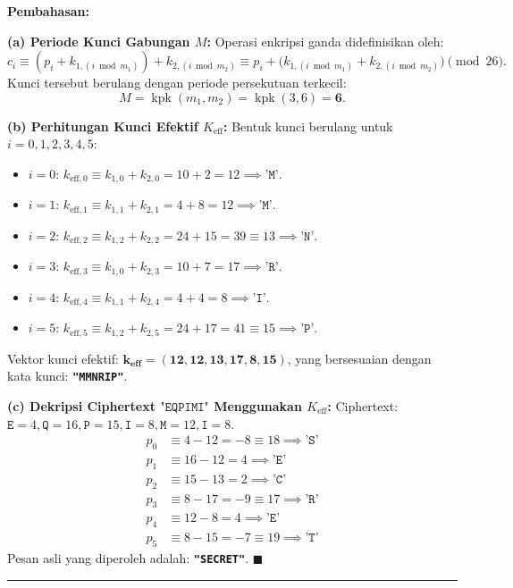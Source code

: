 \documentclass[11pt,a4paper]{article}
\newenvironment{solusi}{\noindent\textbf{\textsf{Pembahasan:}}\par\vspace{0.2em}}{\hfill$\blacksquare$\vspace{1em}\par\hrule\vspace{1em}}
\begin{document}
\begin{solusi}
\textbf{(a) Periode Kunci Gabungan $M$:}
Operasi enkripsi ganda didefinisikan oleh:
\[
c_i \equiv (p_i + k_{1, (i \bmod m_1)}) + k_{2, (i \bmod m_2)} \equiv p_i + \big(k_{1, (i \bmod m_1)} + k_{2, (i \bmod m_2)}\big) \pmod{26}.
\]
Kunci tersebut berulang dengan periode persekutuan terkecil:
\[
M = \operatorname{kpk}(m_1, m_2) = \operatorname{kpk}(3, 6) = \mathbf{6}.
\]

\vspace{0.2cm}
\textbf{(b) Perhitungan Kunci Efektif $K_{\text{eff}}$:}
Bentuk kunci berulang untuk $i = 0, 1, 2, 3, 4, 5$:
\begin{itemize}[leftmargin=*]
    \item $i=0$: $k_{\text{eff}, 0} \equiv k_{1, 0} + k_{2, 0} = 10 + 2 = 12 \implies \texttt{'M'}$.
    \item $i=1$: $k_{\text{eff}, 1} \equiv k_{1, 1} + k_{2, 1} = 4 + 8 = 12 \implies \texttt{'M'}$.
    \item $i=2$: $k_{\text{eff}, 2} \equiv k_{1, 2} + k_{2, 2} = 24 + 15 = 39 \equiv 13 \implies \texttt{'N'}$.
    \item $i=3$: $k_{\text{eff}, 3} \equiv k_{1, 0} + k_{2, 3} = 10 + 7 = 17 \implies \texttt{'R'}$.
    \item $i=4$: $k_{\text{eff}, 4} \equiv k_{1, 1} + k_{2, 4} = 4 + 4 = 8 \implies \texttt{'I'}$.
    \item $i=5$: $k_{\text{eff}, 5} \equiv k_{1, 2} + k_{2, 5} = 24 + 17 = 41 \equiv 15 \implies \texttt{'P'}$.
\end{itemize}
Vektor kunci efektif: $\mathbf{k_{\text{eff}} = (12, 12, 13, 17, 8, 15)}$, yang bersesuaian dengan kata kunci: \textbf{\texttt{"MMNRIP"}}.

\vspace{0.2cm}
\textbf{(c) Dekripsi Ciphertext $\texttt{"EQPIMI"}$ Menggunakan $K_{\text{eff}}$:}
Ciphertext: $\texttt{E}=4, \texttt{Q}=16, \texttt{P}=15, \texttt{I}=8, \texttt{M}=12, \texttt{I}=8$.
\begin{align*}
p_0 &\equiv 4 - 12 = -8 \equiv 18 \implies \texttt{'S'} \\
p_1 &\equiv 16 - 12 = 4 \implies \texttt{'E'} \\
p_2 &\equiv 15 - 13 = 2 \implies \texttt{'C'} \\
p_3 &\equiv 8 - 17 = -9 \equiv 17 \implies \texttt{'R'} \\
p_4 &\equiv 12 - 8 = 4 \implies \texttt{'E'} \\
p_5 &\equiv 8 - 15 = -7 \equiv 19 \implies \texttt{'T'}
\end{align*}
Pesan asli yang diperoleh adalah: \textbf{\texttt{"SECRET"}}.
\end{solusi}
\end{document}
